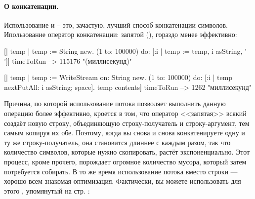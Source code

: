\documentclass[a4paper,10pt,twoside]{book}
\begin{document}
\paragraph{О конкатенации.}
Использование  и  -- это, зачастую, лучший способ конкатенации символов. Ипользование оператор конкатенации: запятой (\ct{,}), гораздо менее эффективно: 

\begin{code}{}
[| temp |
  temp := String new.
  (1 to: 100000)
    do: [:i | temp := temp, i asString, ' ']] timeToRun --> 115176 "(миллисекунд)"

[| temp |
  temp := WriteStream on: String new.
  (1 to: 100000)
    do: [:i | temp nextPutAll: i asString; space].
  temp contents] timeToRun --> 1262 "миллисекунд"
\end{code}

Причина, по которой использование потока позволяет выполнить данную операцию более эффективно, кроется в том, что оператор <<запятая>> всякий создаёт новую строку, объединяющую строку-получатель и строку-аргумент, тем самым копируя их обе.
Поэтому, когда вы снова и снова конкатенируете одну и ту же строку-получатель, она становится длиннее с каждым разом, так что количество символов, которые нужно скопировать, растёт экспоненциально.
Этот процесс, кроме прочего, порождает огромное количество мусора, который затем потребуется собирать. В то же время использование потока вместо строки --- хорошо всем знакомая оптимизация.
Фактически, вы можете использовать для этого , упомянутый на стр. \pageref{sec:streamContents}:
\end{document}
